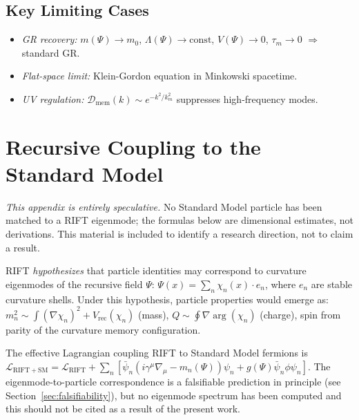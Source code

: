 \documentclass[12pt,a4paper]{article}
\begin{document}
\subsection{Key Limiting Cases}

\begin{itemize}
  \item \emph{GR recovery:} $m(\Psi)\to m_0$, $\Lambda(\Psi)\to\mathrm{const}$, $V(\Psi)\to 0$, $\tau_m\to 0$ $\Rightarrow$ standard GR.
  \item \emph{Flat-space limit:} Klein-Gordon equation in Minkowski spacetime.
  \item \emph{UV regulation:} $\mathcal{D}_{\mathrm{mem}}(k) \sim e^{-k^2/k_m^2}$ suppresses high-frequency modes.
\end{itemize}

\section{Recursive Coupling to the Standard Model}
\label{app:SM}

\emph{This appendix is entirely speculative.}  No Standard Model particle has
been matched to a RIFT eigenmode; the formulas below are dimensional estimates,
not derivations.  This material is included to identify a research direction,
not to claim a result.

RIFT \emph{hypothesizes} that particle identities may correspond to curvature
eigenmodes of the recursive field $\Psi$:
$\Psi(x) = \sum_n \chi_n(x)\cdot e_n$,
where $e_n$ are stable curvature shells. Under this hypothesis, particle
properties would emerge as:
$m_n^2 \sim \int (\nabla\chi_n)^2 + V_{\mathrm{rec}}(\chi_n)$ (mass),
$Q \sim \oint \nabla\arg(\chi_n)$ (charge),
spin from parity of the curvature memory configuration.

The effective Lagrangian coupling RIFT to Standard Model fermions is
$\mathcal{L}_{\mathrm{RIFT+SM}} = \mathcal{L}_{\mathrm{RIFT}} + \sum_n[\bar\psi_n(i\gamma^\mu\nabla_\mu - m_n(\Psi))\psi_n + g(\Psi)\bar\psi_n\phi\psi_n]$.
The eigenmode-to-particle correspondence is a falsifiable prediction in principle
(see Section~\ref{sec:falsifiability}), but no eigenmode spectrum has been
computed and this should not be cited as a result of the present work.
\end{document}

